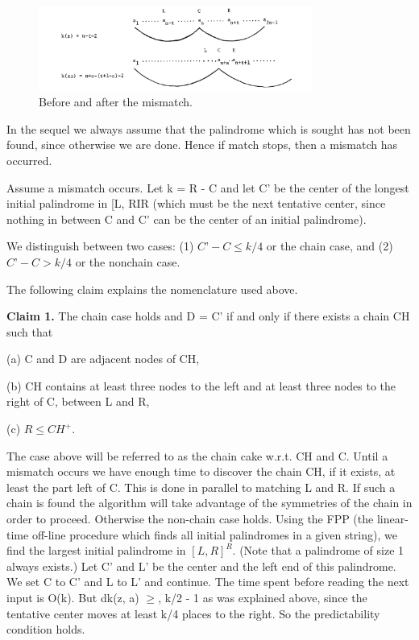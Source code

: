 \documentclass[11pt,a4paper]{report}
\begin{document}
\begin{figure}[h]
    \centerline{\includegraphics[width=0.8\textwidth]{./images/1.png}}
    \caption{Before and after the mismatch.}
    \label{fig}
\end{figure}


In the sequel we always assume that the palindrome which is sought has not been
found, since otherwise we are done. Hence if match stops, then a mismatch has occurred.

Assume a mismatch occurs. Let k = R - C and let C’ be the center of the longest
initial palindrome in [L, RIR (which must be the next tentative center, since nothing in
between C and C’ can be the center of an initial palindrome).

We distinguish between two cases: (1) $C’ - C \leq k/4 $ or the chain case, and (2)
$C’ - C > k/4$ or the nonchain case.

The following claim explains the nomenclature used above.

\textbf{Claim 1.} The chain case holds and D = C’ if and only if there exists a chain CH
such that

(a) C and D are adjacent nodes of CH,

(b) CH contains at least three nodes to the left and at least three nodes to the
right of C, between L and R,

(c) $R \leq CH^+$.

The case above will be referred to as the chain cake w.r.t. CH and C. Until a mismatch
occurs we have enough time to discover the chain CH, if it exists, at least the part left
of C. This is done in parallel to matching L and R. If such a chain is found the algorithm
will take advantage of the symmetries of the chain in order to proceed. Otherwise the
non-chain case holds. Using the FPP (the linear-time off-line procedure which finds
all initial palindromes in a given string), we find the largest initial palindrome in $[L, R]^R $.
(Note that a palindrome of size 1 always exists.) Let C’ and L’ be the center and the left
end of this palindrome. We set C to C’ and L to L’ and continue. The time spent before
reading the next input is O(k). But dk(z, a) $\geq$, k/2 - 1 as was explained above, since
the tentative center moves at least k/4 places to the right. So the predictability condition
holds. 
\end{document}
